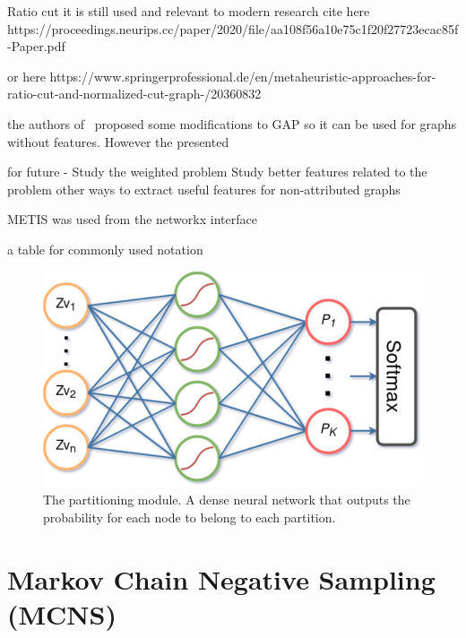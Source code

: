 Ratio cut it is still used and relevant to modern research cite here https://proceedings.neurips.cc/paper/2020/file/aa108f56a10e75c1f20f27723ecac85f-Paper.pdf

or here https://www.springerprofessional.de/en/metaheuristic-approaches-for-ratio-cut-and-normalized-cut-graph-/20360832    

the authors of~\cite{gap2} proposed some modifications to GAP so it can be used for graphs without features. However the presented 

for future - Study the weighted problem
Study better features related to the problem
other ways to extract useful features for non-attributed graphs

METIS was used from the networkx interface

a table for commonly used notation

\begin{figure}
    \label{fig:partitioning_module}
    \begin{center}
        \includegraphics[scale=0.5]{partitioning_module}
    \end{center}
    \caption{The partitioning module. A dense neural network that outputs the probability for each node to belong to each partition.}
\end{figure}

\section{Markov Chain Negative Sampling (MCNS)}
